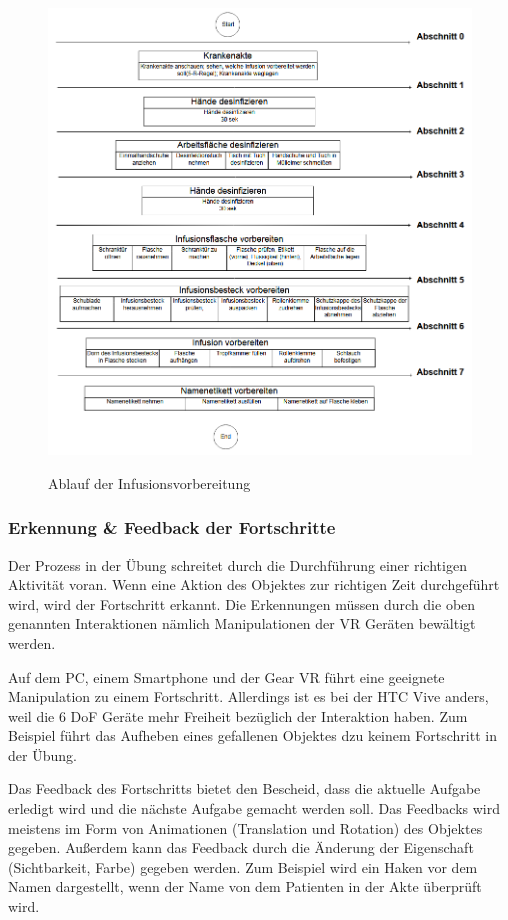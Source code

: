 \begin{figure}[ht]
\vspace*{1em}
\centering
\caption{Ablauf der Infusionsvorbereitung}
\includegraphics[width=\textwidth]{images/ablaufFertig.png}
\label{fig:AblaufInfusionsvorbereitung} 
\end{figure}
  
  \subsubsection{Erkennung \& Feedback der Fortschritte}
  Der Prozess in der Übung schreitet durch die Durchführung einer richtigen Aktivität voran. Wenn eine Aktion des Objektes zur richtigen Zeit durchgeführt wird, wird der Fortschritt erkannt. Die Erkennungen müssen durch die oben genannten Interaktionen nämlich Manipulationen der VR Geräten bewältigt werden.
  
  Auf dem PC, einem Smartphone und der Gear VR führt eine geeignete Manipulation zu einem Fortschritt. Allerdings ist es bei der HTC Vive anders, weil die 6 DoF Geräte mehr Freiheit bezüglich der Interaktion haben. Zum Beispiel führt das Aufheben eines gefallenen Objektes dzu keinem Fortschritt in der Übung. 
  
  Das Feedback des Fortschritts bietet den Bescheid, dass die aktuelle Aufgabe erledigt wird und die nächste Aufgabe gemacht werden soll. Das Feedbacks wird meistens im Form von Animationen (Translation und Rotation) des Objektes gegeben. Außerdem kann das Feedback durch die Änderung der Eigenschaft (Sichtbarkeit, Farbe) gegeben werden. Zum Beispiel wird ein Haken vor dem Namen dargestellt, wenn der Name von dem Patienten in der Akte überprüft wird.
  
